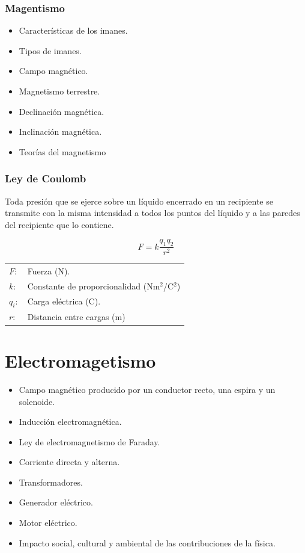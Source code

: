 \documentclass[handout]{beamer}
\begin{document}
\begin{frame}
  \frametitle{Magentismo}


  \begin{itemize}
  \item Características de los imanes.
  \item Tipos de imanes.
  \item Campo magnético.
  \item Magnetismo terrestre.
  \item Declinación magnética.
  \item Inclinación magnética.
  \item Teorías del magnetismo
  \end{itemize}




\begin{frame}
  \frametitle{Ley de Coulomb}
  \begin{block}{}
    Toda presión que se ejerce sobre un líquido encerrado en un recipiente se transmite
    con la misma intensidad a todos los puntos del líquido y a las paredes del recipiente
    que lo contiene.
  \end{block}
  
  {\huge \[F = k  \frac{q_1 q_2}{r^2}\]}
  
  \begin{tabular}{ll}
    $F:$ & Fuerza (N).  \\ 
    $k:$ & Constante de proporcionalidad (Nm$^2$/C$^2$) \\ 
    $q_i:$ & Carga eléctrica (C). \\
    $r:$ & Distancia entre cargas (m) \\
  \end{tabular}
  
\end{frame}

\section{Electromagetismo}

\begin{itemize}
\item Campo magnético producido por un conductor recto, una espira y un solenoide.
\item Inducción electromagnética.
\item Ley de electromagnetismo de Faraday.
\item Corriente directa y alterna.
\item Transformadores.
\item Generador eléctrico.
\item Motor eléctrico.
\item Impacto social, cultural y ambiental de las contribuciones de la física.
\end{itemize}
\end{frame}
\end{document}
